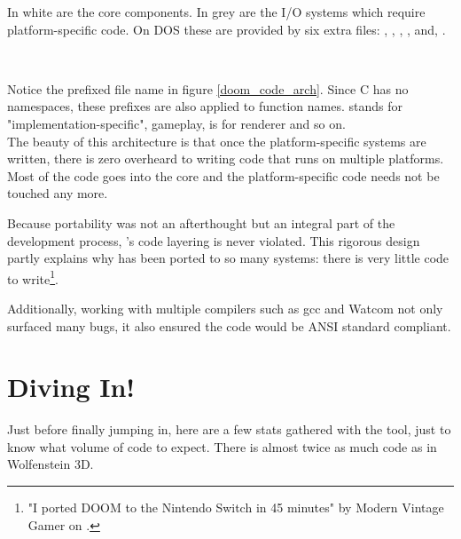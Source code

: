 \pagebreak
{}
\par
In white are the core components. In grey are the I/O systems which require platform-specific code. On DOS these are provided by six extra files: , , , ,  and, .\\









\vspace{-4mm}
\\
\par
Notice the prefixed file name in figure \ref{doom_code_arch}. Since C has no namespaces, these prefixes are also applied to function names.  stands for "implementation-specific",  gameplay,  is for renderer and so on.\\

The beauty of this architecture is that once the platform-specific systems are written, there is zero overheard to writing code that runs on multiple platforms. Most of the code goes into the core and the platform-specific code needs not be touched any more.\\
\par
Because portability was not an afterthought but an integral part of the development process, \doom{}'s code layering is never violated. This rigorous design partly explains why \doom{} has been ported to so many systems: there is very little code to write\footnote{"I ported DOOM to the Nintendo Switch in 45 minutes" by Modern Vintage Gamer on .}.\\
\par 
Additionally, working with multiple compilers such as gcc and Watcom not only surfaced many bugs, it also ensured the code would be ANSI standard compliant.\\
\vspace{-15pt}
\section{Diving In!}
Just before finally jumping in, here are a few stats gathered with the  tool, just to know what volume of code to expect. There is almost twice as much code as in Wolfenstein 3D.\\
\par
{}
\par

